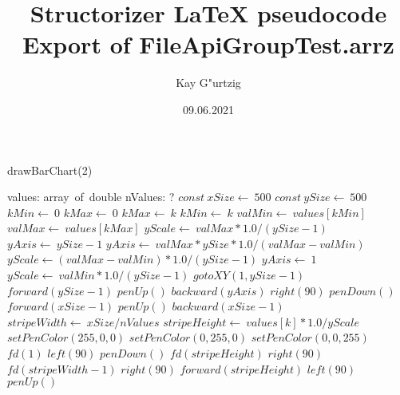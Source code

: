 \documentclass[a4paper,10pt]{article}
\title{Structorizer LaTeX pseudocode Export of FileApiGroupTest.arrz}
\author{Kay G"urtzig}
\date{09.06.2021}
\begin{document}
\begin{algorithm}
\caption{drawBarChart(2)}
\begin{algorithmic}[5]
\State {}
\State {}
\State {}
\State {}
    \State values: array\ of\ double
    \State nValues: ?
  \EndDecl
  \State \(const\ xSize\gets\ 500\)
  \State \(const\ ySize\gets\ 500\)
  \State \(kMin\gets\ 0\)
  \State \(kMax\gets\ 0\)
      \State \(kMax\gets\ k\)
    \Else
        \State \(kMin\gets\ k\)
      \EndIf
    \EndIf
  \EndFor
  \State \(valMin\gets\ values[kMin]\)
  \State \(valMax\gets\ values[kMax]\)
  \State \(yScale\gets\ valMax*1.0/(ySize-1)\)
  \State \(yAxis\gets\ ySize-1\)
      \State \(yAxis\gets\ valMax*ySize*1.0/(valMax-valMin)\)
      \State \(yScale\gets(valMax-valMin)*1.0/(ySize-1)\)
    \Else
      \State \(yAxis\gets\ 1\)
      \State \(yScale\gets\ valMin*1.0/(ySize-1)\)
    \EndIf
  \EndIf
  \State \(gotoXY(1,ySize-1)\)
  \State \(forward(ySize-1)\)
  \State \(penUp()\)
  \State \(backward(yAxis)\)
  \State \(right(90)\)
  \State \(penDown()\)
  \State \(forward(xSize-1)\)
  \State \(penUp()\)
  \State \(backward(xSize-1)\)
  \State \(stripeWidth\gets\ xSize/nValues\)
    \State \(stripeHeight\gets\ values[k]*1.0/yScale\)
        \State \(setPenColor(255,0,0)\)
      \EndSelector
        \State \(setPenColor(0,255,0)\)
      \EndSelector
        \State \(setPenColor(0,0,255)\)
      \EndSelector
    \EndCase
    \State \(fd(1)\)
    \State \(left(90)\)
    \State \(penDown()\)
    \State \(fd(stripeHeight)\)
    \State \(right(90)\)
    \State \(fd(stripeWidth-1)\)
    \State \(right(90)\)
    \State \(forward(stripeHeight)\)
    \State \(left(90)\)
    \State \(penUp()\)
  \EndFor
\EndProcedure
\end{algorithmic}
\end{algorithm}
\end{document}
